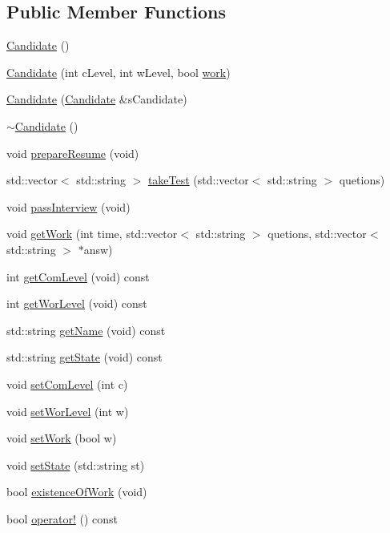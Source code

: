 \subsection*{Public Member Functions}
\begin{DoxyCompactItemize}
\item 
\hyperlink{class_candidate_aa2747741fb662af5e8f3d01d1d1a43b6}{Candidate} ()
\item 
\hyperlink{class_candidate_a627ea8e00c8e5a4a6d4427a2ac41d41a}{Candidate} (int c\+Level, int w\+Level, bool \hyperlink{class_candidate_ab0a3583b677b47424e2da3f267a8036a}{work})
\item 
\hyperlink{class_candidate_a318c0f73f0e3091883c66ef970b3794e}{Candidate} (\hyperlink{class_candidate}{Candidate} \&s\+Candidate)
\item 
\hyperlink{class_candidate_a61ad4ae35e7a3ce5e5b91204b55c0b55}{$\sim$\+Candidate} ()
\item 
void \hyperlink{class_candidate_afee91575da03a495aad2f45f84ae341c}{prepare\+Resume} (void)
\item 
std\+::vector$<$ std\+::string $>$ \hyperlink{class_candidate_ab30f3859931c02d8cf69acb49a80c12e}{take\+Test} (std\+::vector$<$ std\+::string $>$ quetions)
\item 
void \hyperlink{class_candidate_ace55597a36842de9f9a44abf59be4eb2}{pass\+Interview} (void)
\item 
void \hyperlink{class_candidate_a50e84cbce900de9863aefb0f5f4a6f68}{get\+Work} (int time, std\+::vector$<$ std\+::string $>$ quetions, std\+::vector$<$ std\+::string $>$ $\ast$answ)
\item 
int \hyperlink{class_candidate_a12bd0777e1b813f1caa683832b28c8f6}{get\+Com\+Level} (void) const
\item 
int \hyperlink{class_candidate_aa6971bae134029ced1180e77bc3662ae}{get\+Wor\+Level} (void) const
\item 
std\+::string \hyperlink{class_candidate_a10f8f982418cc3db29c6f211a2b24ebf}{get\+Name} (void) const
\item 
std\+::string \hyperlink{class_candidate_a31fdda5e5a9cb8abbe3506b5a8bc33ab}{get\+State} (void) const
\item 
void \hyperlink{class_candidate_a936a7347b368ef38d994d4aecf4cee0c}{set\+Com\+Level} (int c)
\item 
void \hyperlink{class_candidate_ab526dc6819fcfb14821a7ba68c543d34}{set\+Wor\+Level} (int w)
\item 
void \hyperlink{class_candidate_ac500f9465747b144c7807b26987c2a3e}{set\+Work} (bool w)
\item 
void \hyperlink{class_candidate_a1fcf329a8244281d0ab8dd4100fc2c41}{set\+State} (std\+::string st)
\item 
bool \hyperlink{class_candidate_ae246e50a0bd6b9fc03a3579dbd178aad}{existence\+Of\+Work} (void)
\item 
bool \hyperlink{class_candidate_a8bfcd5a62801d4b6df95cf2ba29cf89d}{operator!} () const
\end{DoxyCompactItemize}
